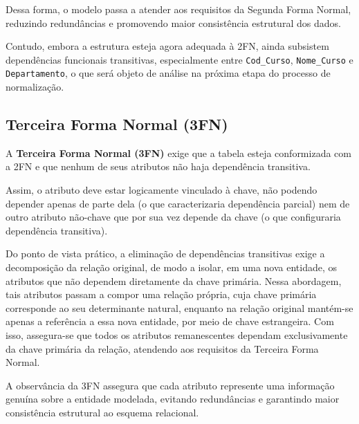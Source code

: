 \begin{tcolorbox}[breakable, colback=blue!5,colframe=blue!40!black,title=Situação exemplo]
Dessa forma, o modelo passa a atender aos requisitos da Segunda Forma Normal, reduzindo redundâncias e promovendo maior consistência estrutural dos dados. 

Contudo, embora a estrutura esteja agora adequada à 2FN, ainda subsistem dependências funcionais transitivas, especialmente entre \texttt{Cod\_Curso}, \texttt{Nome\_Curso} e \texttt{Departamento}, o que será objeto de análise na próxima etapa do processo de normalização.

\end{tcolorbox}

\subsection{Terceira Forma Normal (3FN)}

A \textbf{Terceira Forma Normal (3FN)} exige que a tabela esteja conformizada com a 2FN e que nenhum de seus atributos não haja dependência transitiva. 

Assim, o atributo deve estar logicamente vinculado à chave, não podendo depender apenas de parte dela (o que caracterizaria dependência parcial) nem de outro atributo não-chave que por sua vez depende da chave (o que configuraria dependência transitiva). 

Do ponto de vista prático, a eliminação de dependências transitivas exige a decomposição da relação original, de modo a isolar, em uma nova entidade, os atributos que não dependem diretamente da chave primária. Nessa abordagem, tais atributos passam a compor uma relação própria, cuja chave primária corresponde ao seu determinante natural, enquanto na relação original mantém-se apenas a referência a essa nova entidade, por meio de chave estrangeira. Com isso, assegura-se que todos os atributos remanescentes dependam exclusivamente da chave primária da relação, atendendo aos requisitos da Terceira Forma Normal.\cite{angelotti2010banco}

A observância da 3FN assegura que cada atributo represente uma informação genuína sobre a entidade modelada, evitando redundâncias e garantindo maior consistência estrutural ao esquema relacional.

